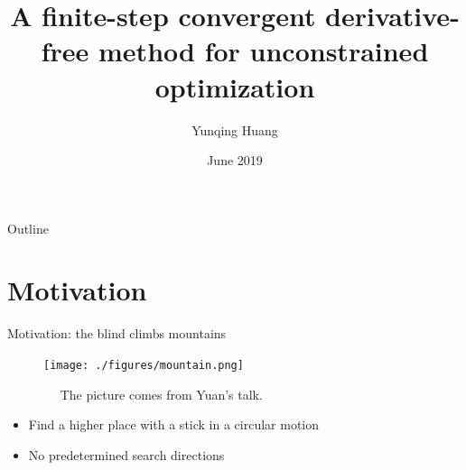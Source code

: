 \documentclass{beamer}
\title[HiCS]
{A finite-step convergent derivative-free method for unconstrained
optimization}
\author[Y. Huang, XTU]{Yunqing Huang}
\institute[]{Xiangtan University
\\
\vspace{0.3cm}
joint work with Kai Jiang}
\date{June 2019}
\begin{document}
\begin{frame}
  \titlepage
\end{frame}

\begin{frame}{Outline}
  \tableofcontents[hideallsubsections]
\end{frame}







\section{Motivation}
\begin{frame}{Motivation: the blind climbs mountains }
\begin{figure}[!htbp]
	\centering
	  \texttt{[image: ./figures/mountain.png]}
	  \caption{~~ The picture comes from Yuan's talk.}
\end{figure}
\begin{itemize}
	\item Find a higher place with a stick in a circular motion
	\item No predetermined search directions
\end{itemize}
\end{frame}
\end{document}
